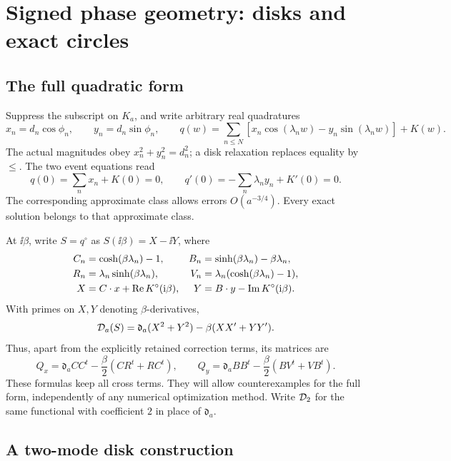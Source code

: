 \section{Signed phase geometry: disks and exact circles}\label{sec:phases}

\subsection{The full quadratic form}

Suppress the subscript on \(K_a\), and write arbitrary real quadratures
\[
 x_n=d_n\cos\phi_n,\qquad y_n=d_n\sin\phi_n,\qquad
 q(w)=\sum_{n\le N}[x_n\cos(\lambda_nw)-y_n\sin(\lambda_nw)]+K(w).
\]
The actual magnitudes obey \(x_n^2+y_n^2=d_n^2\); a disk relaxation
replaces equality by \(\le\). The two event equations read
\begin{equation}\label{eq:eventquadratures}
 q(0)=\sum_nx_n+K(0)=0,\qquad
 q'(0)=-\sum_n\lambda_n y_n+K'(0)=0.
\end{equation}
The corresponding approximate class allows errors \(O(a^{-3/4})\).
Every exact solution belongs to that approximate class.

At \(\ii\beta\), write \(S=q^\circ\) as \(S(\ii\beta)=X-\ii Y\), where
\begin{align}
 C_n&=\cosh(\beta\lambda_n)-1,&
 B_n&=\sinh(\beta\lambda_n)-\beta\lambda_n,\\
 R_n&=\lambda_n\sinh(\beta\lambda_n),&
 V_n&=\lambda_n(\cosh(\beta\lambda_n)-1),\\
 X&=C\cdot x+\operatorname{Re} K^\circ(\mathrm i\beta),&
 Y&=B\cdot y-\operatorname{Im} K^\circ(\mathrm i\beta).
\end{align}
With primes on \(X,Y\) denoting \(\beta\)-derivatives,
\begin{equation}\label{eq:XY}
 \mathcal D_a(S)=\mathfrak d_a(X^2+Y^2)-\beta(XX'+YY').
\end{equation}
Thus, apart from the explicitly retained correction terms, its matrices
are
\[
 Q_x=\mathfrak d_a CC^t-\frac\beta2(CR^t+RC^t),\qquad
 Q_y=\mathfrak d_a BB^t-\frac\beta2(BV^t+VB^t).
\]
These formulas keep all cross terms. They will allow counterexamples
for the full form, independently of any numerical optimization method.
Write \(\mathcal D_2\) for the same functional with coefficient \(2\) in
place of \(\mathfrak d_a\).

\subsection{A two-mode disk construction}

